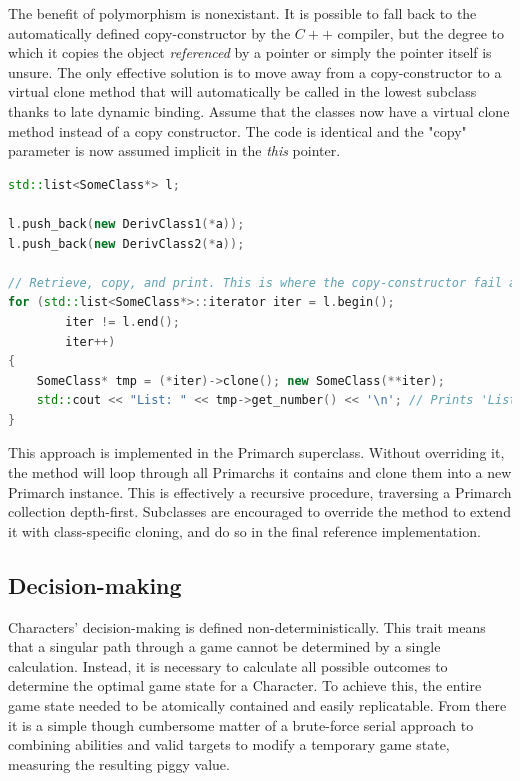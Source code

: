The benefit of polymorphism is nonexistant. It is possible to fall back to the automatically defined copy-constructor by the $C++$ compiler, but the degree to which it copies the object \emph{referenced} by a pointer or simply the pointer itself is unsure. The only effective solution is to move away from a copy-constructor to a virtual clone method that will automatically be called in the lowest subclass thanks to late dynamic binding. Assume that the classes now have a virtual clone method instead of a copy constructor. The code is identical and the "copy" parameter is now assumed implicit in the \emph{this} pointer.

\begin{lstlisting}[language=C++]
std::list<SomeClass*> l;

l.push_back(new DerivClass1(*a));
l.push_back(new DerivClass2(*a));
    
// Retrieve, copy, and print. This is where the copy-constructor fail appears.
for (std::list<SomeClass*>::iterator iter = l.begin();
        iter != l.end();
        iter++)
{
    SomeClass* tmp = (*iter)->clone(); new SomeClass(**iter);
    std::cout << "List: " << tmp->get_number() << '\n'; // Prints 'List: x', where x is the correct output from get_number()
}
\end{lstlisting}

This approach is implemented in the Primarch superclass. Without overriding it, the method will loop through all Primarchs it contains and clone them into a new Primarch instance. This is effectively a recursive procedure, traversing a Primarch collection depth-first. Subclasses are encouraged to override the method to extend it with class-specific cloning, and do so in the final reference implementation.

\subsection{Decision-making}
Characters' decision-making is defined non-deterministically. This trait means that a singular path through a game cannot be determined by a single calculation. Instead, it is necessary to calculate all possible outcomes to determine the optimal game state for a Character. To achieve this, the entire game state needed to be atomically contained and easily replicatable. From there it is a simple though cumbersome matter of a brute-force serial approach to combining abilities and valid targets to modify a temporary game state, measuring the resulting piggy value.

